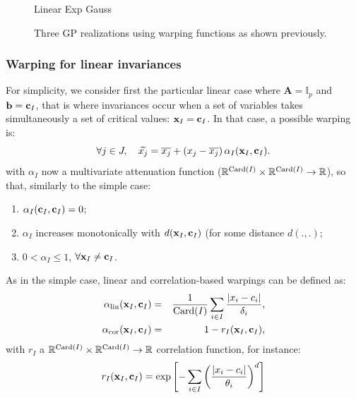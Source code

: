 \begin{figure}[!ht]
\centering
Linear \hspace{4cm} Exp \hspace{4cm} Gauss
 \caption{Three GP realizations using warping functions as shown previously.}\label{fig:simu2Dsimple}
\end{figure}

\subsubsection{Warping for linear invariances}
For simplicity, we consider first the particular linear case where $\mathbf{A} = \mathbb{I}_p$ and $\mathbf{b}=\mathbf{c}_I$, 
that is where invariances occur when a set of variables takes simultaneously a set of critical values: $\mathbf{x}_I = \mathbf{c}_I$.
In that case, a possible warping is:
\begin{equation}
 \forall j \in J, \quad \widetilde{x_j} = \overline{x_j} + \left( x_j - \overline{x_j}\right) {\alpha_I}(\mathbf{x}_I, \mathbf{c}_I)\label{eq:and}.
\end{equation}
with ${\alpha_I}$ now a multivariate attenuation function ($\mathbb{R}^{\operatorname{Card}(I)} \times \mathbb{R}^{\operatorname{Card}(I)} \rightarrow \mathbb{R}$), so that, similarly to the simple case: 
\begin{enumerate}
 \item $\alpha_I(\mathbf{c}_I, \mathbf{c}_I) = 0$;
 \item $\alpha_I$ increases monotonically with $d(\mathbf{x}_I, \mathbf{c}_I)$ (for some distance $d(.,.)$;
 \item $0 < \alpha_I \leq 1$, $\forall \mathbf{x}_I \neq \mathbf{c}_I$.
\end{enumerate}

As in the simple case, linear and correlation-based warpings can be defined as:
\begin{eqnarray}
 \alpha_\text{lin}(\mathbf{x}_I,  \mathbf{c}_I) &=& \frac{1}{\operatorname{Card}(I)} \sum_{i \in I}\frac{\lvert x_i - c_i \rvert}{\delta_i}, \\
  \alpha_\text{cor}(\mathbf{x}_I,  \mathbf{c}_I) &=& 1 - r_I(\mathbf{x}_I, \mathbf{c}_I),
\end{eqnarray}
with $r_I$ a $\mathbb{R}^{\operatorname{Card}(I)} \times \mathbb{R}^{\operatorname{Card}(I)} \rightarrow \mathbb{R}$ correlation function, for instance:
$$r_I(\mathbf{x}_I, \mathbf{c}_I) = \exp \left[ - \sum_{i \in I}\left(\frac{\lvert x_i - c_i \rvert}{\theta_i}\right)^d \right] $$

